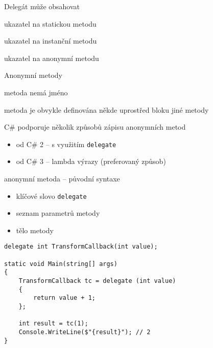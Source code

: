 \begin{frame}[fragile]
\begin{bitemize}{Delegát může obsahovat}
\item ukazatel na statickou metodu
\item ukazatel na instanční metodu
\item ukazatel na anonymní metodu
\end{bitemize}
\end{frame}





\begin{frame}[fragile]
\begin{bitemize}{Anonymní metody}
\item metoda nemá jméno
\item metoda je obvykle definována někde uprostřed bloku jiné metody
\item C\# podporuje několik způsobů zápisu anonymních metod
\begin{itemize}
\item od C\# 2 -- s využitím \lstinline|delegate|
\item od C\# 3 -- lambda výrazy (preferovaný způsob)
\end{itemize}

\end{bitemize}
\end{frame}


\begin{frame}[fragile]
\begin{bitemize}{}
\item anonymní metoda -- původní syntaxe
\begin{itemize}
\item klíčové slovo \lstinline|delegate|
\item seznam parametrů metody
\item tělo metody
\end{itemize}
\end{bitemize}
\vfill
\begin{yesblock}
\begin{lstlisting}
delegate int TransformCallback(int value);

static void Main(string[] args)
{
    TransformCallback tc = delegate (int value)
    {
        return value + 1;
    };

    int result = tc(1);
    Console.WriteLine($"{result}"); // 2
}
\end{lstlisting}
\end{yesblock}
\end{frame}




